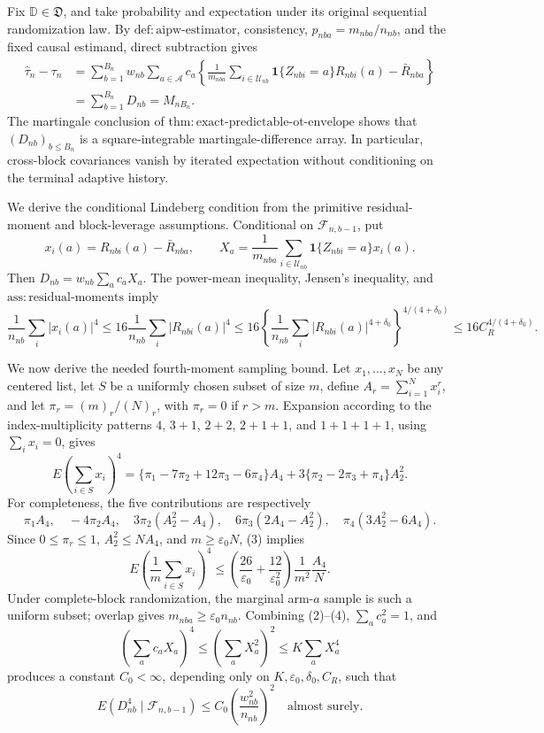 Fix \(\mathbb D\in\mathfrak D\), and take probability and expectation under its original sequential randomization law. By \(\mathrm{def:aipw\text{-}estimator}\), consistency, \(p_{nba}=m_{nba}/n_{nb}\), and the fixed causal estimand, direct subtraction gives
\[
\begin{aligned}
\widehat\tau_n-\tau_n
&=\sum_{b=1}^{B_n}w_{nb}\sum_{a\in\mathcal A}c_a
\left\{\frac1{m_{nba}}\sum_{i\in\mathcal U_{nb}}
\mathbf1\{Z_{nbi}=a\}R_{nbi}(a)-\bar R_{nba}\right\}\\
&=\sum_{b=1}^{B_n}D_{nb}=M_{nB_n}.
\end{aligned}
\tag{1}
\]
The martingale conclusion of \(\mathrm{thm:exact\text{-}predictable\text{-}ot\text{-}envelope}\) shows that \((D_{nb})_{b\le B_n}\) is a square-integrable martingale-difference array. In particular, cross-block covariances vanish by iterated expectation without conditioning on the terminal adaptive history.

We derive the conditional Lindeberg condition from the primitive residual-moment and block-leverage assumptions. Conditional on \(\mathcal F_{n,b-1}\), put
\[
x_i(a)=R_{nbi}(a)-\bar R_{nba},
\qquad
X_a=\frac1{m_{nba}}\sum_{i\in\mathcal U_{nb}}
\mathbf1\{Z_{nbi}=a\}x_i(a).
\]
Then \(D_{nb}=w_{nb}\sum_ac_aX_a\). The power-mean inequality, Jensen's inequality, and \(\mathrm{ass:residual\text{-}moments}\) imply
\[
\frac1{n_{nb}}\sum_i|x_i(a)|^4
\le16\frac1{n_{nb}}\sum_i|R_{nbi}(a)|^4
\le16\left\{\frac1{n_{nb}}\sum_i|R_{nbi}(a)|^{4+\delta_0}\right\}^{4/(4+\delta_0)}
\le16C_R^{4/(4+\delta_0)}.
\tag{2}
\]

We now derive the needed fourth-moment sampling bound. Let \(x_1,\ldots,x_N\) be any centered list, let \(S\) be a uniformly chosen subset of size \(m\), define \(A_r=\sum_{i=1}^Nx_i^r\), and let \(\pi_r=(m)_r/(N)_r\), with \(\pi_r=0\) if \(r>m\). Expansion according to the index-multiplicity patterns \(4\), \(3+1\), \(2+2\), \(2+1+1\), and \(1+1+1+1\), using \(\sum_ix_i=0\), gives
\[
E\left(\sum_{i\in S}x_i\right)^4
=\{\pi_1-7\pi_2+12\pi_3-6\pi_4\}A_4
+3\{\pi_2-2\pi_3+\pi_4\}A_2^2.
\tag{3}
\]
For completeness, the five contributions are respectively
\[
\pi_1A_4,\quad -4\pi_2A_4,\quad
3\pi_2(A_2^2-A_4),\quad
6\pi_3(2A_4-A_2^2),\quad
\pi_4(3A_2^2-6A_4).
\]
Since \(0\le\pi_r\le1\), \(A_2^2\le NA_4\), and \(m\ge\varepsilon_0N\), (3) implies
\[
E\left(\frac1m\sum_{i\in S}x_i\right)^4
\le\left(\frac{26}{\varepsilon_0}+\frac{12}{\varepsilon_0^2}\right)
\frac1{m^2}\frac{A_4}{N}.
\tag{4}
\]
Under complete-block randomization, the marginal arm-\(a\) sample is such a uniform subset; overlap gives \(m_{nba}\ge\varepsilon_0n_{nb}\). Combining (2)--(4), \(\sum_ac_a^2=1\), and
\[
\left(\sum_ac_aX_a\right)^4
\le\left(\sum_aX_a^2\right)^2
\le K\sum_aX_a^4
\]
produces a constant \(C_0<\infty\), depending only on \(K,\varepsilon_0,\delta_0,C_R\), such that
\[
E(D_{nb}^4\mid\mathcal F_{n,b-1})
\le C_0\left(\frac{w_{nb}^2}{n_{nb}}\right)^2
\quad\text{almost surely}.
\tag{5}
\]

